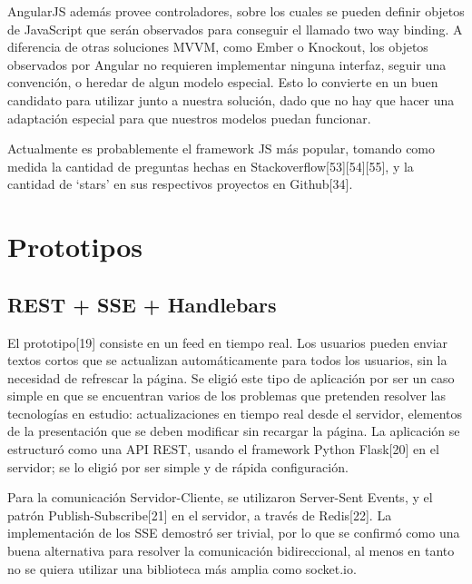 \documentclass[doc,helv,longtable]{article}
\begin{document}
AngularJS además provee controladores, sobre los cuales se pueden definir objetos de JavaScript que serán observados para conseguir el llamado two way binding. A diferencia de otras soluciones MVVM, como Ember o Knockout, los objetos observados por Angular no requieren implementar ninguna interfaz, seguir una convención, o heredar de algun modelo especial. Esto lo convierte en un buen candidato para utilizar junto a nuestra solución, dado que no hay que hacer una adaptación especial para que nuestros modelos puedan funcionar. 

Actualmente es probablemente el framework JS más popular, tomando como medida la cantidad de preguntas hechas en Stackoverflow[53][54][55], y la cantidad de ‘stars’ en sus respectivos proyectos en Github[34].

\section{Prototipos}
\subsection{REST + SSE + Handlebars}
El prototipo[19] consiste en un feed en tiempo real. Los usuarios pueden enviar textos cortos que se actualizan automáticamente para todos los usuarios, sin la necesidad de refrescar la página. Se eligió este tipo de aplicación por ser un caso simple en que se encuentran varios de los problemas que pretenden resolver las tecnologías en estudio: actualizaciones en tiempo real desde el servidor, elementos de la presentación que se deben modificar sin recargar la página. La aplicación se estructuró como una API REST, usando el framework Python Flask[20] en el servidor; se lo eligió por ser simple y de rápida configuración. 

Para la comunicación Servidor-Cliente, se utilizaron Server-Sent Events, y el patrón Publish-Subscribe[21] en el servidor, a través de Redis[22]. La implementación de los SSE demostró ser trivial, por lo que se confirmó como una buena alternativa para resolver la comunicación bidireccional, al menos en tanto no se quiera utilizar una biblioteca más amplia como socket.io.
\end{document}
